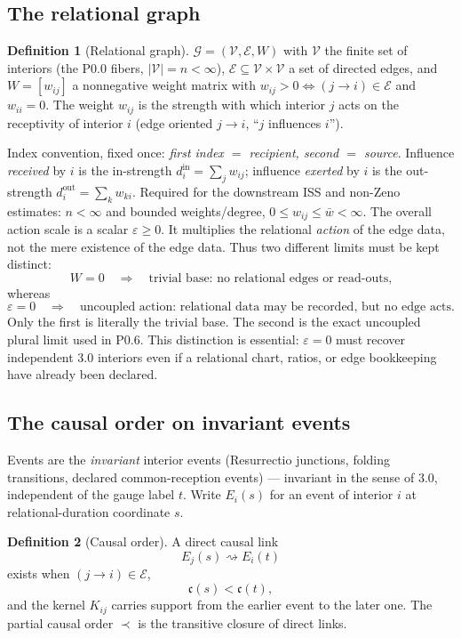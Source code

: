 \documentclass[11pt,a4paper]{article}
\theoremstyle{definition}
\newtheorem{definition}{Definition}[section]
\theoremstyle{plain}
\theoremstyle{remark}
\begin{document}
\subsection{The relational graph}

\begin{definition}[Relational graph]
$\mathcal G=(\mathcal V,\mathcal E,W)$ with $\mathcal V$ the finite set of interiors
(the P0.0 fibers, $|\mathcal V|=n<\infty$), $\mathcal E\subseteq\mathcal V\times\mathcal V$
a set of directed edges, and $W=[w_{ij}]$ a nonnegative weight matrix with
$w_{ij}>0\iff(j\!\to\!i)\in\mathcal E$ and $w_{ii}=0$. The weight $w_{ij}$ is the
strength with which interior $j$ acts on the receptivity of interior $i$ (edge
oriented $j\!\to\!i$, ``$j$ influences $i$'').
\end{definition}

Index convention, fixed once: \emph{first index $=$ recipient, second $=$ source}.
Influence \emph{received} by $i$ is the in-strength $d_i^{\mathrm{in}}=\sum_j w_{ij}$;
influence \emph{exerted} by $i$ is the out-strength $d_i^{\mathrm{out}}=\sum_k w_{ki}$.
Required for the downstream ISS and non-Zeno estimates: $n<\infty$ and bounded
weights/degree, $0\le w_{ij}\le\bar w<\infty$. The overall action scale is a scalar
\(\varepsilon\ge0\). It multiplies the relational \emph{action} of the edge data, not
the mere existence of the edge data. Thus two different limits must be kept distinct:
\[
W=0
\quad\Longrightarrow\quad
\text{trivial base: no relational edges or read-outs,}
\]
whereas
\[
\varepsilon=0
\quad\Longrightarrow\quad
\text{uncoupled action: relational data may be recorded, but no edge acts.}
\]
Only the first is literally the trivial base. The second is the exact uncoupled
plural limit used in P0.6. This distinction is essential: \(\varepsilon=0\) must
recover independent 3.0 interiors even if a relational chart, ratios, or edge
bookkeeping have already been declared.

\subsection{The causal order on invariant events}

Events are the \emph{invariant} interior events (Resurrectio junctions, folding
transitions, declared common-reception events) --- invariant in the sense of 3.0,
independent of the gauge label $t$. Write $E_i(s)$ for an event of interior $i$ at
relational-duration coordinate $s$.

\begin{definition}[Causal order]
A direct causal link
\[
E_j(s)\rightsquigarrow E_i(t)
\]
exists when $(j\!\to\!i)\in\mathcal E$,
\[
\mathfrak c(s)<\mathfrak c(t),
\]
and the kernel $K_{ij}$ carries support from the earlier event to the later one.
The partial causal order $\prec$ is the transitive closure of direct links.
\end{definition}
\end{document}
